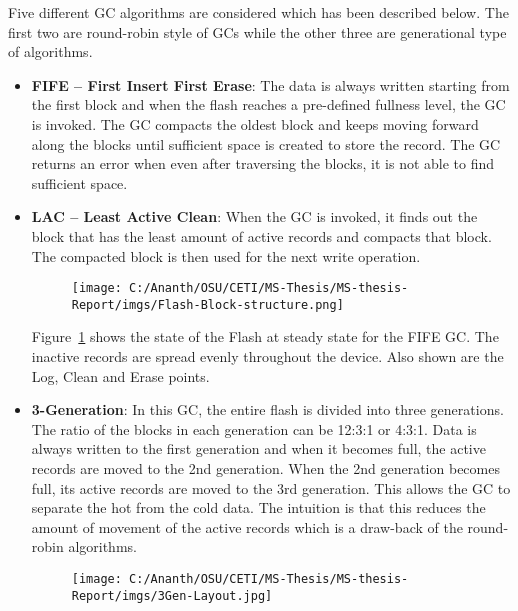 Five different GC algorithms are considered which has been described below. The first two are round-robin style of GCs while the other three are generational type of algorithms.
\begin{itemize}
\item {\bf FIFE – First Insert First Erase}:
The data is always written starting from the first block and when the flash reaches a pre-defined fullness level, the GC is invoked. The GC compacts the oldest block and keeps moving forward along the blocks until sufficient space is created to store the record. The GC returns an error when even after traversing the blocks, it is not able to find sufficient space. 
\item {\bf LAC – Least Active Clean}:
When the GC is invoked, it finds out the block that has the least amount of active records and compacts that block. The compacted block is then used for the next write operation.

\begin{figure}
	\centering
	\texttt{[image: C:/Ananth/OSU/CETI/MS-Thesis/MS-thesis-Report/imgs/Flash-Block-structure.png]}
	 \label{FIFE-GC-Fragmentation}
\end{figure}

Figure~\ref{FIFE-GC-Fragmentation} shows the state of the Flash at steady state for the FIFE GC. The inactive records are spread evenly throughout the device. Also shown are the Log, Clean and Erase points.

\item {\bf 3-Generation}:
In this GC, the entire flash is divided into three generations. The ratio of the blocks in each generation can be 12:3:1 or 4:3:1. Data is always written to the first generation and when it becomes full, the active records are moved to the 2nd generation. When the 2nd generation becomes full, its active records are moved to the 3rd generation. This allows the GC to separate the hot from the cold data. The intuition is that this reduces the amount of movement of the active records which is a draw-back of the round-robin algorithms.

\begin{figure}
	\centering
	\texttt{[image: C:/Ananth/OSU/CETI/MS-Thesis/MS-thesis-Report/imgs/3Gen-Layout.jpg]}
	 \label{3Gen-GC-Fragmentation}
\end{figure}


\end{itemize}
